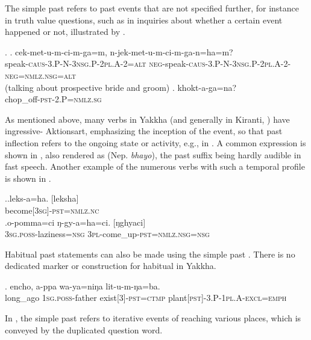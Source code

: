 The simple past  refers to past events that are not specified further, for instance in truth value questions, such as  in inquiries about whether a certain event happened or not, illustrated by \Next. 

\ex. \ag.  cek-met-u-m-ci-m-ga=m, n-jek-met-u-m-ci-m-ga-n=ha=m?\\
speak{\scshape -caus-3.P-N-3nsg.P-2pl.A-2=alt} {\scshape neg-}speak{\scshape -caus-3.P-N-3nsg.P-2pl.A-2-neg=nmlz.nsg=alt}\\
 (talking about prospective bride and groom) 
\bg. khokt-a-ga=na?\\
chop\_off{\scshape -pst-2.P=nmlz.sg}\\
 


As mentioned above, many verbs in Yakkha (and generally in Kiranti, \citealt[512]{Ebert2003Kiranti}) have ingressive- Aktionsart, emphasizing the inception of the event, so that past inflection refers to the ongoing state or activity, e.g., in \Last[b]. A common expression is shown in \Next[a], also rendered as  (Nep. \emph{bhayo}), the past suffix being hardly audible in fast speech. Another example of the numerous verbs with such a temporal profile is shown in \Next[b].

\ex.\ag.leks-a=ha. [leksha]\\
become{\scshape [3sg]-pst=nmlz.nc}\\
\bg.o-pomma=ci ŋ-gy-a=ha=ci. [ŋghyaci]\\
{\scshape 3sg.poss-}laziness{\scshape =nsg} {\scshape 3pl-}come\_up{\scshape -pst=nmlz.nsg=nsg}\\

Habitual past statements can also be made using the simple past \Next. There is no dedicated marker or construction for habitual  in Yakkha.

\exg. encho,        a-ppa             wa-ya=niŋa               lit-u-m-ŋa=ba.\\
long\_ago {\scshape 1sg.poss-}father exist{\scshape [3]-pst=ctmp} plant{\scshape [pst]-3.P-1pl.A-excl=emph}\\
 

In \Next, the simple past refers to iterative events of reaching various places, which is conveyed by the duplicated question word.

